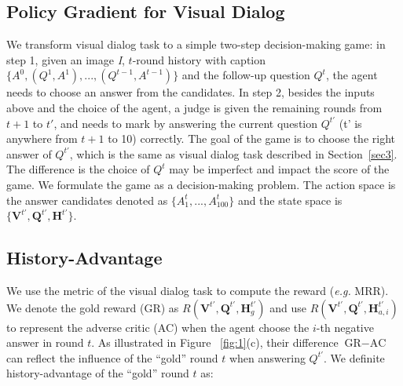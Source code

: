 \documentclass[10pt,twocolumn,letterpaper]{article}
\begin{document}
\subsection{Policy Gradient for Visual Dialog}\label{sec:4.1}
We transform visual dialog task to a simple two-step decision-making game: in step 1, given an image \emph{I}, $t$-round history with caption $\{A^0,(Q^{1},A^{1}),...,(Q^{t-1},A^{t-1})\}$ and the follow-up question $Q^t$, the agent needs to choose an answer from the candidates. In step 2, besides the inputs above and the choice of the agent, a judge is given the remaining rounds from $t+1$ to $t'$, and needs to mark by answering the current question $Q^{t'}$ (t' is anywhere from $t+1$ to 10) correctly. The goal of the game is to choose the right answer of $Q^{t'}$, which is the same as visual dialog task described in Section~\ref{sec3}. The difference is the choice of $Q^{t}$ may be imperfect and impact the score of the game. We formulate the game as a decision-making problem. The action space is the answer candidates denoted as $\{{A^{t}_{1}},...,{A^{t}_{100}}\}$ and the state space is $\{\bm{V}^{t'},\bm{Q}^{t'},\bm{H}^{t'}\}$. 






\subsection{History-Advantage}\label{sec:4.2}
 We use the metric of the visual dialog task to compute the reward (\emph{e.g.} MRR). We denote the gold reward (GR) as $R(\bm{V}^{t'},\bm{Q}^{t'},\bm{H}^{t'}_{g})$ and use $R(\bm{V}^{t'}, \bm{Q}^{t'}, \bm{H}^{t'}_{a,i})$ to represent the adverse critic (AC) when the agent choose the $i$-th negative answer in round $t$. As illustrated in Figure ~\ref{fig:1}(c), their difference $\textrm{GR} - \textrm{AC}$ can reflect the influence of the ``gold'' round $t$ when answering $Q^{t'}$. We definite history-advantage of the ``gold'' round $t$ as:
 
\end{document}
